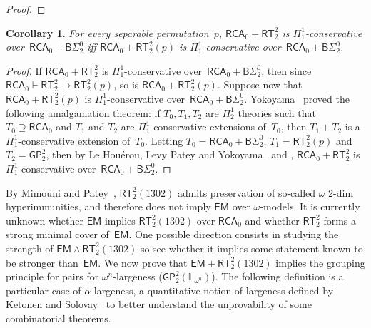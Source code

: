\documentclass{article}
\numberwithin{theorem}{section}
\newtheorem{corollary}[theorem]{Corollary}
\def\LL{\mathbb{L}}
\newcommand{\BSig}{\mathsf{B}\Sigma^0}
\newcommand{\RCA}[0]{\mathsf{RCA}}
\newcommand{\ADS}[0]{\mathsf{ADS}}
\newcommand{\EM}[0]{\mathsf{EM}}
\newcommand{\RT}[0]{\mathsf{RT}}
\newcommand{\SRT}[0]{\mathsf{SRT}}
\newcommand{\COH}[0]{\mathsf{COH}}
\newcommand{\GP}{\mathsf{GP}}
\newcommand{\SGP}{\mathsf{SGP}}
\newcommand{\NN}[0]{\mathbb{N}}
\begin{document}
\begin{proof}
\end{proof}

\begin{corollary}
For every separable permutation~$p$, $\RCA_0 + \RT^2_2$ is $\Pi^1_1$-conservative over~$\RCA_0 + \BSig_2$ iff $\RCA_0 + \RT^2_2(p)$ is $\Pi^1_1$-conservative over~$\RCA_0 + \BSig_2$.
\end{corollary}
\begin{proof}
If $\RCA_0 + \RT^2_2$ is $\Pi^1_1$-conservative over~$\RCA_0 + \BSig_2$, then since  $\RCA_0 \vdash \RT^2_2 \to \RT^2_2(p)$, so is $\RCA_0 + \RT^2_2(p)$. Suppose now that $\RCA_0 + \RT^2_2(p)$ is $\Pi^1_1$-conservative over~$\RCA_0 + \BSig_2$. Yokoyama~\cite{yokoyama2010conservativity} proved the following amalgamation theorem: if $T_0, T_1, T_2$ are $\Pi^1_2$ theories such that $T_0 \supseteq \RCA_0$ and $T_1$ and $T_2$ are $\Pi^1_1$-conservative extensions of~$T_0$, then $T_1 + T_2$ is a $\Pi^1_1$-conservative extension of~$T_0$. Letting $T_0 = \RCA_0 + \BSig_2$, $T_1 = \RT^2_2(p)$ and $T_2 = \GP^2_2$, then by Le Houérou, Levy Patey and Yokoyama~\cite{houerou2023conservation} and , $\RCA_0 + \RT^2_2$ is $\Pi^1_1$-conservative over~$\RCA_0 + \BSig_2$.
\end{proof}

By Mimouni and Patey~\cite{mimouni2025ramseylike}, $\RT^2_2(1302)$ admits preservation of so-called $\omega$ 2-dim hyperimmunities, and therefore does not imply $\EM$ over $\omega$-models. 
It is currently unknown whether $\EM$ implies $\RT^2_2(1302)$ over $\RCA_0$ and whether $\RT^2_2$ forms a strong minimal cover of~$\EM$. One possible direction consists in studying the strength of $\EM \wedge \RT^2_2(1302)$ so see whether it implies some statement known to be stronger than~$\EM$. We now prove that $\EM + \RT^2_2(1302)$ implies the grouping principle for pairs for $\omega^n$-largeness ($\GP^2_2(\LL_{\omega^n})$). %
The following definition is a parti\-cular case of $\alpha$-largeness, a quantitative notion of largeness defined by Ketonen and Solovay~\cite{ketonen1981rapidly} to better understand the unprovability of some combinatorial theorems.
\end{document}
